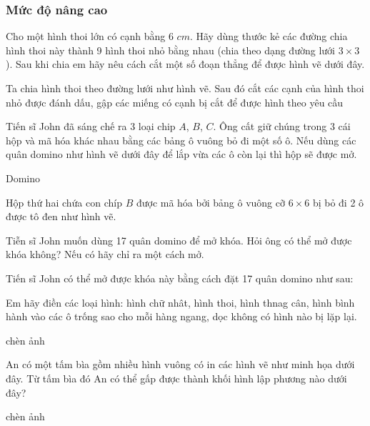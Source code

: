 \subsubsection*{Mức độ nâng cao}
\begin{bt}
	Cho một hình thoi lớn có cạnh bằng 6 $cm$. Hãy dùng thước kẻ các đường chia hình thoi này thành 9 hình thoi nhỏ bằng nhau (chia theo dạng đường lưới $3\times 3$). Sau  khi chia em hãy nêu cách cắt một số đoạn thẳng để được hình vẽ dưới đây.
	\begin{loigiaichuong35}
		Ta chia hình thoi theo đường lưới như hình vẽ. Sau đó cắt các cạnh của hình thoi nhỏ được đánh dấu, gập các miếng có cạnh bị cắt để được hình theo yêu cầu 
	\end{loigiaichuong35}
\end{bt}
\begin{bt}
	Tiến sĩ John đã sáng chế ra 3 loại chip $A$, $B$, $C$. Ông cất giữ chúng trong 3 cái hộp và mã hóa khác nhau bằng các bảng ô vuông bỏ đi một số ô. Nếu dùng các quân domino như hình vẽ dưới đây để lắp vừa các ô còn lại thì hộp sẽ được mở.
	
	Domino
	
	Hộp thứ hai chứa con chíp $B$ được mã hóa bởi bảng ô vuông cỡ $6 \times 6$ bị bỏ đi 2 ô được tô đen như hình vẽ.
	
	Tiễn sĩ John muốn dùng 17 quân domino để mở khóa. Hỏi ông có thể mở được khóa không? Nếu có hãy chỉ ra một cách mở.
	\begin{loigiaichuong35}
		Tiến sĩ John có thể mở được khóa này bằng cách đặt 17 quân domino như sau: 
	\end{loigiaichuong35}
\end{bt}
\begin{bt}
	Em hãy điền các loại hình: hình chữ nhât, hình thoi, hình thnag cân, hình bình hành vào các ô trống sao cho mỗi hàng ngang, dọc không có hình nào bị lặp lại.
	\begin{loigiaichuong35}
		chèn ảnh
	\end{loigiaichuong35}
\end{bt}
\begin{bt}
	An có một tấm bìa gồm nhiều hình vuông có in các hình vẽ như minh họa dưới đây.
	Từ tấm bìa đó An có thể gấp được thành khối hình lập phương nào dưới đây?
	\begin{loigiaichuong35}
		chèn ảnh
	\end{loigiaichuong35}
\end{bt}
